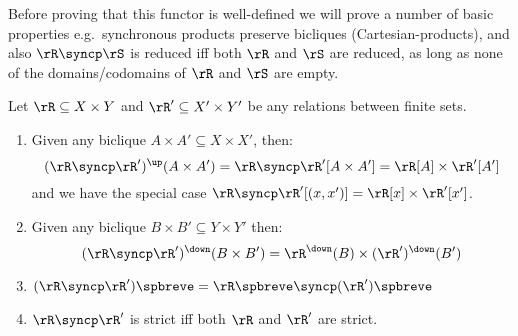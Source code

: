 \documentclass{article}
\begin{document}
Before proving that this functor is well-defined we will prove a number of basic properties e.g.\ synchronous products preserve bicliques (Cartesian-products), and also $\rR \syncp \rS$ is reduced iff both $\rR$ and $\rS$ are reduced, as long as none of the domains/codomains of $\rR$ and $\rS$ are empty.


\begin{lemma}
\label{lem:sync_functor_basic}
Let $\rR \subseteq X \times Y$ and $\rR' \subseteq X' \times Y'$ be any relations between finite sets.
\begin{enumerate}
\item
Given any biclique $A \times A' \subseteq X \times X'$, then:
\[
(\rR \syncp \rR')^\up (A \times A') 
= \rR \syncp \rR' [ A \times A'] 
= \rR[A] \times \rR'[A']
\]
and we have the special case $\rR \syncp \rR' [(x,x')] = \rR[x] \times \rR'[x']$.

\item
Given any biclique $B \times B' \subseteq Y \times Y'$ then:
\[
(\rR \syncp \rR')^\down (B \times B') = \rR^\down(B) \times (\rR')^\down(B')
\]

\item
$(\rR \syncp \rR')\spbreve = \rR\spbreve \syncp (\rR')\spbreve$

\item
$\rR \syncp \rR'$ is strict iff both $\rR$ and $\rR'$ are strict.

\end{enumerate}
\end{lemma}
\end{document}
